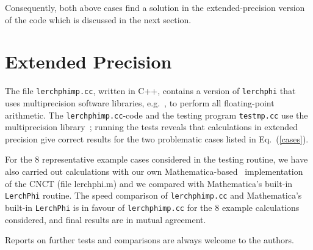 \documentclass[11pt]{article}
\begin{document}
Consequently, both above cases find a solution in the 
extended-precision version of the code which is discussed
in the next section.

%
%
\section{Extended Precision}

The file {\tt lerchphimp.cc}, written in C++, contains a version
of {\tt lerchphi} that
uses multiprecision software libraries, e.g.~\cite{BaURL,BrURL}, 
to perform all floating-point arithmetic. 
The {\tt lerchphimp.cc}-code and the testing program {\tt testmp.cc} use the
multiprecision library~\cite{BaURL}; running the tests reveals 
that calculations in extended precision give correct 
results for the two problematic cases listed in
Eq.~(\ref{cases}). 

For the 8 representative example cases considered in the testing
routine, we have also carried out calculations with our own
Mathematica-based~\cite{Wo1988} implementation of the CNCT 
(file {\rm lerchphi.m})
and we compared with Mathematica's built-in {\tt LerchPhi}
routine. The speed comparison of {\tt lerchphimp.cc}
and Mathematica's built-in {\tt LerchPhi} is in favour of {\tt lerchphimp.cc}
for the 8 example calculations considered,
and final results are in mutual agreement.

Reports on further tests and comparisons are always welcome to the authors.
\end{document}
